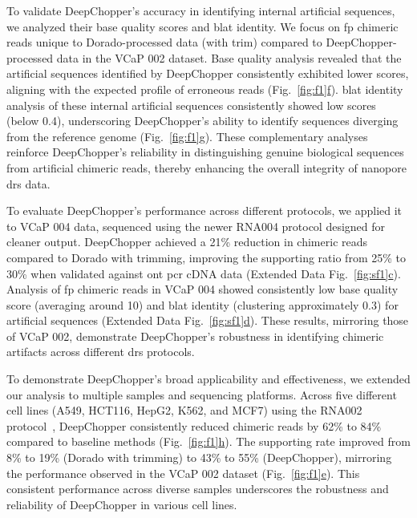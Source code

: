 \documentclass[pdflatex,sn-nature, lineno]{sn-jnl}%
\newcommand{\figref}[2]{Fig.~\hyperref[#1]{\ref*{#1}#2}}
\newcommand{\edfigref}[2]{Extended Data Fig.~\hyperref[#1]{\ref*{#1}#2}}
\theoremstyle{thmstyleone}%
\theoremstyle{thmstyletwo}%
\theoremstyle{thmstylethree}%
\begin{document}
To validate DeepChopper's accuracy in identifying internal artificial sequences, we analyzed their base quality scores and \gls{blat} identity.
We focus on \gls{fp} chimeric reads unique to Dorado-processed data (with trim) compared to DeepChopper-processed data in the VCaP 002 dataset.
Base quality analysis revealed that the artificial sequences identified by DeepChopper consistently exhibited lower scores, aligning with the expected profile of erroneous reads (\figref{fig:f1}{f}).
\gls{blat} identity analysis of these internal artificial sequences consistently showed low scores (below 0.4), underscoring DeepChopper's ability to identify sequences diverging from the reference genome (\figref{fig:f1}{g}).
These complementary analyses reinforce DeepChopper's reliability in distinguishing genuine biological sequences from artificial chimeric reads, thereby enhancing the overall integrity of nanopore \gls{drs} data.

To evaluate DeepChopper's performance across different protocols, we applied it to VCaP 004 data, sequenced using the newer RNA004 protocol designed for cleaner output.
DeepChopper achieved a 21\% reduction in chimeric reads compared to Dorado with trimming, improving the supporting ratio from 25\% to 30\% when validated against \gls{ont} \gls{pcr} cDNA data (\edfigref{fig:sf1}{c}).
Analysis of \gls{fp} chimeric reads in VCaP 004 showed consistently low base quality score (averaging around 10) and \gls{blat} identity (clustering approximately 0.3) for artificial sequences (\edfigref{fig:sf1}{d}).
These results, mirroring those of VCaP 002, demonstrate DeepChopper's robustness in identifying chimeric artifacts across different \gls{drs} protocols.

To demonstrate DeepChopper's broad applicability and effectiveness, we extended our analysis to multiple samples and sequencing platforms.
Across five different cell lines (A549, HCT116, HepG2, K562, and MCF7) using the RNA002 protocol~\cite{chen2021systematic}, DeepChopper consistently reduced chimeric reads by 62\% to 84\% compared to baseline methods (\figref{fig:f1}{h}).
The supporting rate improved from 8\% to 19\% (Dorado with trimming) to 43\% to 55\% (DeepChopper), mirroring the performance observed in the VCaP 002 dataset (\figref{fig:f1}{e}).
This consistent performance across diverse samples underscores the robustness and reliability of DeepChopper in various cell lines.
\end{document}
